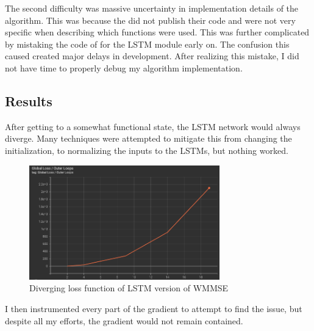 \documentclass[journal]{IEEEtran}
\begin{document}
The second difficulty was massive uncertainty in implementation details of the algorithm. This was because the \cite{LSTM_Net} did not publish their code and were not very specific when describing which functions were used. This was further complicated by mistaking the code of \cite{Deep_Unfolding} for the LSTM module early on. The confusion this caused created major delays in development. After realizing this mistake, I did not have time to properly debug my algorithm implementation.

\subsection{Results}
After getting to a somewhat functional state, the LSTM network would always diverge. Many techniques were attempted to mitigate this from changing the initialization, to normalizing the inputs to the LSTMs, but nothing worked.

\begin{figure}[h]%
\includegraphics[width=3.25in]{assets/Exploding_Loss_Normalization.png}%
\caption{Diverging loss function of LSTM version of WMMSE}%
\label{fig:LSTM_Algo}%
\end{figure}

I then instrumented every part of the gradient to attempt to find the issue, but despite all my efforts, the gradient would not remain contained.

\end{document}
